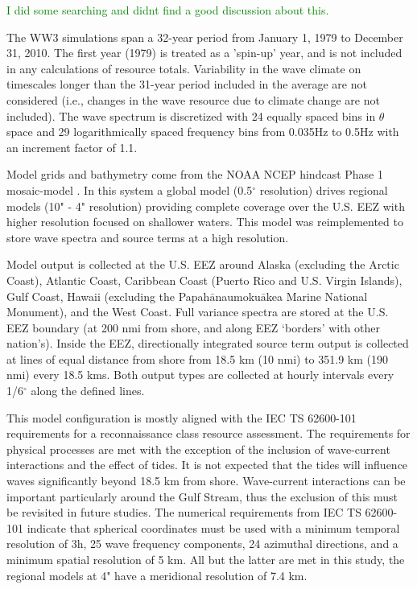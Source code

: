 \textcolor{green}{I did some searching and didnt find a good discussion about this.} 


The WW3 simulations span a 32-year period from January 1, 1979 to December 31, 2010. The first year (1979) is treated as a 'spin-up' year, and is not included in any calculations of resource totals. Variability in the wave climate on timescales longer than the 31-year period included in the average are not considered (i.e., changes in the wave resource due to climate change are not included). The wave spectrum is discretized with 24 equally spaced bins in $\theta$ space and 29 logarithmically spaced frequency bins from 0.035Hz to 0.5Hz with an increment factor of 1.1. 

Model grids and bathymetry come from the NOAA NCEP hindcast Phase 1 mosaic-model \citep{chawla2011wavewatch,chawla201230}. In this system a global model (0.5$^{\circ}$ resolution) drives regional models (10" - 4" resolution) providing complete coverage over the U.S. EEZ with higher resolution focused on shallower waters. This model was reimplemented to store wave spectra and source terms at a high resolution.

Model output is collected at the U.S. EEZ around Alaska (excluding the Arctic Coast), Atlantic Coast, Caribbean Coast (Puerto Rico and U.S. Virgin Islands), Gulf Coast, Hawaii (excluding the Papah$\bar{\text{a}}$naumoku$\bar{\text{a}}$kea Marine National Monument), and the West Coast. Full variance spectra are stored at the U.S. EEZ boundary (at 200 nmi from shore, and along EEZ `borders' with other nation's). Inside the EEZ, directionally integrated source term output is collected at lines of equal distance from shore from 18.5 km (10 nmi) to 351.9 km (190 nmi) every 18.5 kms. Both output types are collected at hourly intervals every 1/6$^{\circ}$ along the defined lines.

This model configuration is mostly aligned with the IEC TS 62600-101 requirements for a reconnaissance class resource assessment. The requirements for physical processes are met with the exception of the inclusion of wave-current interactions and the effect of tides. It is not expected that the tides will influence waves significantly beyond 18.5 km from shore. Wave-current interactions can be important particularly around the Gulf Stream, thus the exclusion of this must be revisited in future studies. The numerical requirements from IEC TS 62600-101 indicate that spherical coordinates must be used with a minimum temporal resolution of 3h, 25 wave frequency components, 24 azimuthal directions, and a minimum spatial resolution of 5 km. All but the latter are met in this study, the regional models at 4" have a meridional resolution of 7.4 km.

